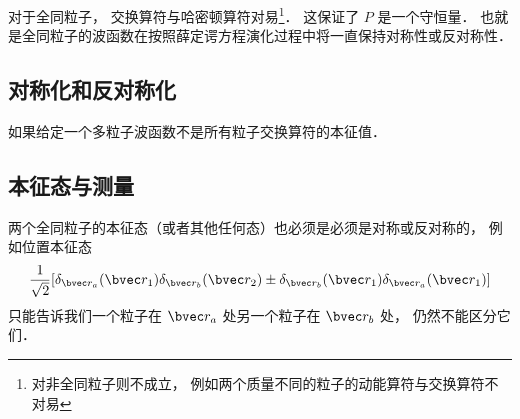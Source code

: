 对于全同粒子， 交换算符与哈密顿算符对易\footnote{对非全同粒子则不成立， 例如两个质量不同的粒子的动能算符与交换算符不对易}． 这保证了 $P$ 是一个守恒量． 也就是全同粒子的波函数在按照薛定谔方程演化过程中将一直保持对称性或反对称性．

\subsection{对称化和反对称化}
如果给定一个多粒子波函数不是所有粒子交换算符的本征值．






\subsection{本征态与测量}
两个全同粒子的本征态（或者其他任何态）也必须是必须是对称或反对称的， 例如位置本征态
$$\frac{1}{\sqrt 2}[\delta_{\bvec r_a}(\bvec r_1) \delta_{\bvec r_b}(\bvec r_2)\pm \delta_{\bvec r_b}(\bvec r_1) \delta_{\bvec r_a}(\bvec r_1)]$$
只能告诉我们一个粒子在 $\bvec r_a$ 处另一个粒子在 $\bvec r_b$ 处， 仍然不能区分它们．

